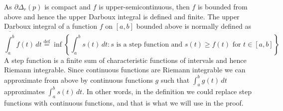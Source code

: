 \documentclass[12pt,openany]{book}
\theoremstyle{plain}
\theoremstyle{remark}
\theoremstyle{definition}
\theoremstyle{exercise}
\theoremstyle{example}
\begin{document}
\pagebreak[2]
As $\partial \Delta_r(p)$ is compact and $f$ is upper-semicontinuous, then
$f$ is bounded from above and hence the upper Darboux integral is defined
and finite.
The upper Darboux integral of a function $f$ on $[a,b]$ bounded above is normally defined as
\begin{equation*}
\overline{\int_a^b} f(t) \,dt
\overset{\text{def}}{=}
\inf \left\{ \int_a^b s(t) \, dt : s
\text{ is a step function and } s(t) \geq f(t) \text{ for } t \in
[a,b] \right\}
\end{equation*}
A step function is a finite sum of characteristic functions of intervals and
hence Riemann integrable.
Since continuous functions are Riemann integrable we can approximate from
above by continuous functions $g$ such that
$\int_a^b g(t)\,dt$
approximates
$\int_a^b s(t)\,dt$.  In other words, in the definition we could replace
step functions with continuous functions, and that is what we will use in
the proof.
\end{document}
